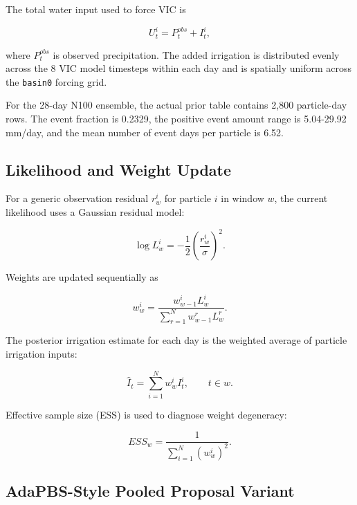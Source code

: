 \documentclass[11pt]{article}
\newcommand{\code}[1]{\texttt{#1}}
\begin{document}
The total water input used to force VIC is

\begin{equation}
U^i_t = P^{obs}_t + I^i_t,
\label{eq:total_water}
\end{equation}

where $P^{obs}_t$ is observed precipitation. The added irrigation is distributed evenly across the 8 VIC model timesteps within each day and is spatially uniform across the \code{basin0} forcing grid.

For the 28-day N100 ensemble, the actual prior table contains 2,800 particle-day rows. The event fraction is 0.2329, the positive event amount range is 5.04-29.92 mm/day, and the mean number of event days per particle is 6.52.

\subsection{Likelihood and Weight Update}

For a generic observation residual $r^i_w$ for particle $i$ in window $w$, the current likelihood uses a Gaussian residual model:

\begin{equation}
\log L^i_w = -\frac{1}{2}\left(\frac{r^i_w}{\sigma}\right)^2.
\label{eq:loglik_generic}
\end{equation}

Weights are updated sequentially as

\begin{equation}
w^i_w = \frac{w^i_{w-1}L^i_w}{\sum_{r=1}^{N}w^r_{w-1}L^r_w}.
\label{eq:weight_update}
\end{equation}

The posterior irrigation estimate for each day is the weighted average of particle irrigation inputs:

\begin{equation}
\hat{I}_t = \sum_{i=1}^{N} w^i_w I^i_t, \qquad t \in w.
\label{eq:posterior_irr}
\end{equation}

Effective sample size (ESS) is used to diagnose weight degeneracy:

\begin{equation}
ESS_w = \frac{1}{\sum_{i=1}^{N}\left(w^i_w\right)^2}.
\label{eq:ess}
\end{equation}

\subsection{AdaPBS-Style Pooled Proposal Variant}
\end{document}
